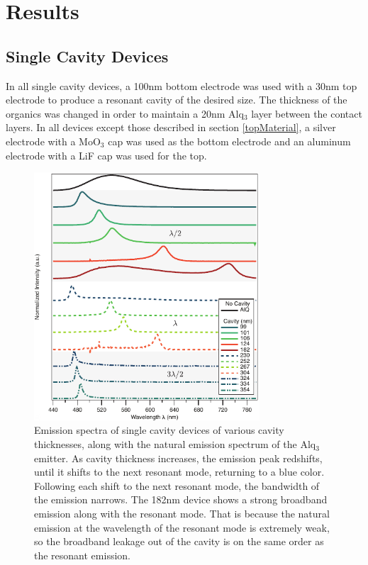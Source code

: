 \documentclass{report}
\begin{document}
\chapter{Results}

    \section{Single Cavity Devices} \label{n=1}

        In all single cavity devices, a 100nm bottom electrode was used with a 30nm top electrode to produce a resonant cavity of the desired size. The thickness of the organics was changed in order to maintain a 20nm Alq$_3$ layer between the contact layers. In all devices except those described in section \ref{topMaterial}, a silver electrode with a MoO$_3$ cap was used as the bottom electrode and an aluminum electrode with a LiF cap was used for the top.
    
        \begin{figure}[h!]%
            \centering
            \includegraphics[width=0.75\textwidth]{images/n1_spectra.png}
            \caption{Emission spectra of single cavity devices of various cavity thicknesses, along with the natural emission spectrum of the Alq$_3$ emitter. As cavity thickness increases, the emission peak redshifts, until it shifts to the next resonant mode, returning to a blue color. Following each shift to the next resonant mode, the bandwidth of the emission narrows. The 182nm device shows a strong broadband emission along with the resonant mode. That is because the natural emission at the wavelength of the resonant mode is extremely weak, so the broadband leakage out of the cavity is on the same order as the resonant emission.}
            \label{fig:n1_spectra}
        \end{figure}
        
\end{document}
